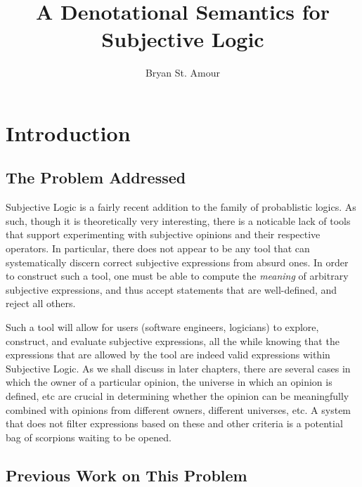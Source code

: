 \documentclass[a4paper]{report}
\title{A Denotational Semantics for Subjective Logic}
\author{Bryan St. Amour}
\begin{document}
\maketitle


\tableofcontents






\chapter{Introduction}
\label{chap:introduction}

\section{The Problem Addressed}

Subjective Logic is a fairly recent addition to the family of probablistic logics. As such, though it
is theoretically very interesting, there is a noticable lack of tools that support experimenting with
subjective opinions and their respective operators. In particular, there does not appear to be any
tool that can systematically discern correct subjective expressions from absurd ones. In order to
construct such a tool, one must be able to compute the \emph{meaning} of arbitrary subjective
expressions, and thus accept statements that are well-defined, and reject all others.

Such a tool will allow for users (software engineers, logicians) to explore, construct, and evaluate
subjective expressions, all the while knowing that the expressions that are allowed by the tool are
indeed valid expressions within Subjective Logic. As we shall discuss in later chapters, there are
several cases in which the owner of a particular opinion, the universe in which an opinion is defined,
etc are crucial in determining whether the opinion can be meaningfully combined with opinions from
different owners, different universes, etc. A system that does not filter expressions based on these
and other criteria is a potential bag of scorpions waiting to be opened.



\section{Previous Work on This Problem}
\end{document}
